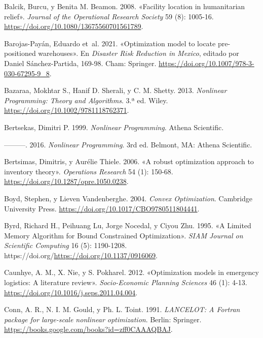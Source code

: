 \documentclass[
  spanish,
  us-letterpaper,
  DIV=11,
  numbers=noendperiod]{scrreprt}
\newlength{\cslhangindent}
\newenvironment{CSLReferences}[2] %
 {\begin{list}{}{%
  \setlength{\itemindent}{0pt}
  \setlength{\leftmargin}{0pt}
  \setlength{\parsep}{0pt}
  \ifodd #1
   \setlength{\leftmargin}{\cslhangindent}
   \setlength{\itemindent}{-1\cslhangindent}
  \fi
  \setlength{\itemsep}{#2\baselineskip}}}
 {\end{list}}
\numberwithin{equation}{section}
\begin{document}
\label{refs}
\begin{CSLReferences}{1}{0}
Balcik, Burcu, y Benita M. Beamon. 2008. {«Facility location in
humanitarian relief»}. \emph{Journal of the Operational Research
Society} 59 (8): 1005-16.
\url{https://doi.org/10.1080/13675560701561789}.

Barojas-Payán, Eduardo et~al. 2021. {«Optimization model to locate
pre-positioned warehouses»}. En \emph{Disaster Risk Reduction in
Mexico}, editado por Daniel Sánchez-Partida, 169-98. Cham: Springer.
\url{https://doi.org/10.1007/978-3-030-67295-9_8}.

Bazaraa, Mokhtar S., Hanif D. Sherali, y C. M. Shetty. 2013.
\emph{Nonlinear Programming: Theory and Algorithms}. 3.ª ed. Wiley.
\url{https://doi.org/10.1002/9781118762371}.

Bertsekas, Dimitri P. 1999. \emph{Nonlinear Programming}. Athena
Scientific.

---------. 2016. \emph{Nonlinear Programming}. 3rd ed. Belmont, MA:
Athena Scientific.

Bertsimas, Dimitris, y Aurélie Thiele. 2006. {«A robust optimization
approach to inventory theory»}. \emph{Operations Research} 54 (1):
150-68. \url{https://doi.org/10.1287/opre.1050.0238}.

Boyd, Stephen, y Lieven Vandenberghe. 2004. \emph{Convex Optimization}.
Cambridge University Press.
\url{https://doi.org/10.1017/CBO9780511804441}.

Byrd, Richard H., Peihuang Lu, Jorge Nocedal, y Ciyou Zhu. 1995. {«A
Limited Memory Algorithm for Bound Constrained Optimization»}.
\emph{SIAM Journal on Scientific Computing} 16 (5): 1190-1208.
https://doi.org/\url{https://doi.org/10.1137/0916069}.

Caunhye, A. M., X. Nie, y S. Pokharel. 2012. {«Optimization models in
emergency logistics: A literature review»}. \emph{Socio-Economic
Planning Sciences} 46 (1): 4-13.
\url{https://doi.org/10.1016/j.seps.2011.04.004}.

Conn, A. R., N. I. M. Gould, y Ph. L. Toint. 1991. \emph{LANCELOT: A
Fortran package for large-scale nonlinear optimization}. Berlin:
Springer. \url{https://books.google.com/books?id=zff0CAAAQBAJ}.


\end{CSLReferences}
\end{document}
